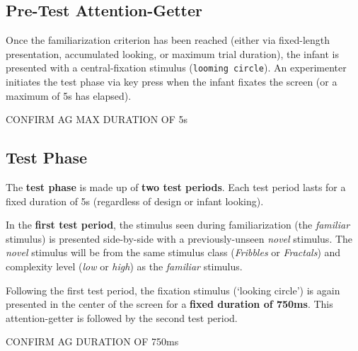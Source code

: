 \documentclass[
  letterpaper,
  DIV=11,
  numbers=noendperiod,
  oneside]{scrreprt}
\begin{document}
\subsection{Pre-Test Attention-Getter}\label{pre-test-attention-getter}

Once the familiarization criterion has been reached (either via
fixed-length presentation, accumulated looking, or maximum trial
duration), the infant is presented with a central-fixation stimulus
(\texttt{looming\ circle}). An experimenter initiates the test phase via
key press when the infant fixates the screen (or a maximum of 5s has
elapsed).

\begin{tcolorbox}[enhanced jigsaw, coltitle=black, colframe=quarto-callout-caution-color-frame, titlerule=0mm, colback=white, arc=.35mm, toprule=.15mm, left=2mm, colbacktitle=quarto-callout-caution-color!10!white, opacityback=0, bottomtitle=1mm, title=\textcolor{quarto-callout-caution-color}{\faFire}\hspace{0.5em}{Caution}, breakable, rightrule=.15mm, opacitybacktitle=0.6, toptitle=1mm, leftrule=.75mm, bottomrule=.15mm]

CONFIRM AG MAX DURATION OF 5s

\end{tcolorbox}

\subsection{Test Phase}\label{sec-testphase}

The \textbf{test phase} is made up of \textbf{two test periods}. Each
test period lasts for a fixed duration of 5s (regardless of
design or
infant looking).

In the \textbf{first test period}, the stimulus seen during
familiarization (the \emph{familiar} stimulus) is presented side-by-side
with a previously-unseen \emph{novel} stimulus. The \emph{novel}
stimulus will be from the same stimulus class (\emph{Fribbles} or
\emph{Fractals}) and complexity level (\emph{low} or \emph{high}) as the
\emph{familiar} stimulus.

Following the first test period, the fixation stimulus (`looking
circle') is again presented in the center of the screen for a
\textbf{fixed duration of 750ms}. This attention-getter is followed by
the second test period.

\begin{tcolorbox}[enhanced jigsaw, coltitle=black, colframe=quarto-callout-caution-color-frame, titlerule=0mm, colback=white, arc=.35mm, toprule=.15mm, left=2mm, colbacktitle=quarto-callout-caution-color!10!white, opacityback=0, bottomtitle=1mm, title=\textcolor{quarto-callout-caution-color}{\faFire}\hspace{0.5em}{Caution}, breakable, rightrule=.15mm, opacitybacktitle=0.6, toptitle=1mm, leftrule=.75mm, bottomrule=.15mm]

CONFIRM AG DURATION OF 750ms

\end{tcolorbox}
\end{document}
